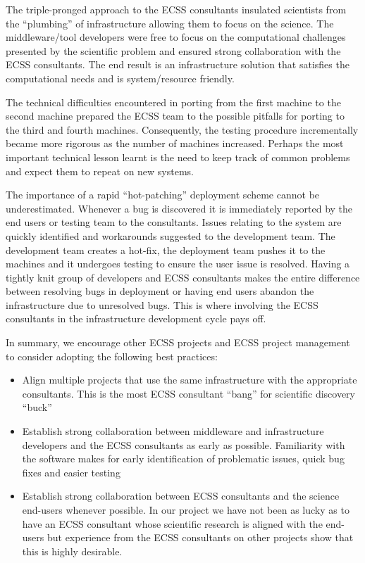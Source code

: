 \documentclass{sig-alternate}
\begin{document}
The triple-pronged approach to the ECSS consultants insulated scientists from
the ``plumbing'' of infrastructure allowing them to focus on the science. The
middleware/tool developers were free to focus on the computational challenges
presented by the scientific problem and ensured strong collaboration with the
ECSS consultants. The end result is an infrastructure solution that satisfies
the computational needs and is system/resource friendly.

The technical difficulties encountered in porting from the first
machine to the second machine prepared the ECSS team to the possible
pitfalls for porting to the third and fourth machines. Consequently,
the testing procedure incrementally became more rigorous as the number
of machines increased. Perhaps the most important technical lesson
learnt is the need to keep track of common problems and expect them to
repeat on new systems.

The importance of a rapid ``hot-patching'' deployment scheme cannot be
underestimated. Whenever a bug is discovered it is immediately
reported by the end users or testing team to the consultants. Issues
relating to the system are quickly identified and workarounds
suggested to the development team. The development team creates a
hot-fix, the deployment team pushes it to the machines and it
undergoes testing to ensure the user issue is resolved. Having a
tightly knit group of developers and ECSS consultants makes the entire
difference between resolving bugs in deployment or having end users
abandon the infrastructure due to unresolved bugs. This is where
involving the ECSS consultants in the infrastructure development cycle
pays off.

In summary, we encourage other ECSS projects and ECSS project
management to consider adopting the following best practices:
\begin{itemize}
 \item Align multiple projects that use the same infrastructure
 with the appropriate consultants. This is the most ECSS consultant
 ``bang'' for scientific discovery ``buck''
 \item Establish strong collaboration between middleware and infrastructure
 developers and the ECSS consultants as early as possible. Familiarity with the software makes for early
 identification of problematic issues, quick bug fixes and easier testing
 \item Establish strong collaboration between ECSS consultants and the science
 end-users whenever possible. In our project we have not been as lucky as to
 have an ECSS consultant whose scientific research is aligned with the end-users
 but experience from the ECSS consultants on other projects show that this is highly
 desirable.
\end{itemize}
\end{document}
